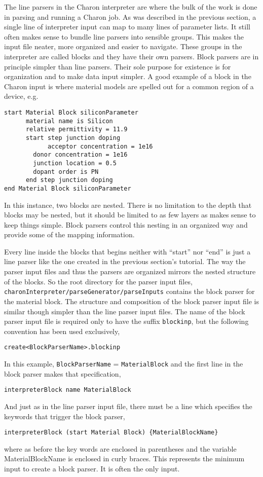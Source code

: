 The line parsers in the Charon interpreter are where the bulk of the
work is done in parsing and running a Charon job.  As was described in
the previous section, a single line of interpreter input can map to
many lines of parameter lists.  It still often makes sense to bundle
line parsers into sensible groups.  This makes the input file neater,
more organized and easier to navigate.  These groups in the
interpreter are called blocks and they have their own parsers.  Block
parsers are in principle simpler than line parsers.  Their sole
purpose for existence is for organization and to make data input
simpler.  A good example of a block in the Charon input is where
material models are spelled out for a common region of a device, e.g.
\begin{lstlisting}
start Material Block siliconParameter
      material name is Silicon
      relative permittivity = 11.9
      start step junction doping
      	    acceptor concentration = 1e16
	    donor concentration = 1e16
	    junction location = 0.5
	    dopant order is PN
      end step junction doping
end Material Block siliconParameter
\end{lstlisting}
In this instance, two blocks are nested.  There is no limitation to
the depth that blocks may be nested, but it should be limited to as
few layers as makes sense to keep things simple.  Block parsers
control this nesting in an organized way and provide some of the
mapping information.  

Every line inside the blocks that begins neither with ``start'' nor
``end'' is just a line parser like the one created in the previous
section's tutorial.  The way the parser input files and thus the
parsers are organized mirrors the nested structure of the blocks.  So
the root directory for the parser input files,
\texttt{charonInterpreter/parseGenerator/parseInputs} contains the
block parser for the material block.  The structure and composition of
the block parser input file is similar though simpler than the line
parser input files.  The name of the block parser input file is
required only to have the suffix \texttt{blockinp}, but the following
convention has been used exclusively,
\begin{lstlisting}
create<BlockParserName>.blockinp
\end{lstlisting}
In this example, \texttt{BlockParserName} = \texttt{MaterialBlock} and
the first line in the block parser makes that specification,
\begin{lstlisting}
interpreterBlock name MaterialBlock
\end{lstlisting}
And just as in the line parser input file, there must be a line which
specifies the keywords that trigger the block parser,
\begin{lstlisting}
interpreterBlock (start Material Block) {MaterialBlockName}
\end{lstlisting}
where as before the key words are enclosed in parentheses and the
variable MaterialBlockName is enclosed in curly braces.  This
represents the minimum input to create a block parser.  It is often
the only input.


